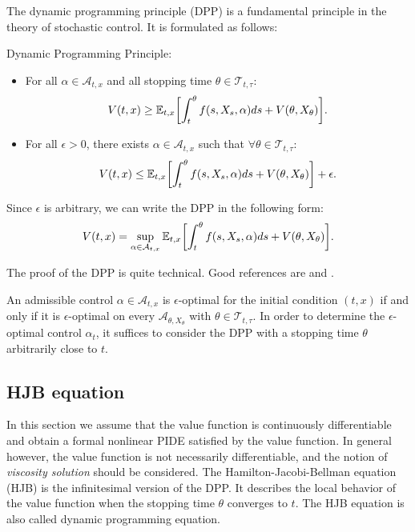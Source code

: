 \noindent
The dynamic programming principle (DPP) is a fundamental principle in the theory of stochastic control. It is formulated as follows:
\begin{Theorem} Dynamic Programming Principle:
 \begin{itemize}
  \item For all $\alpha \in \mathcal{A}_{t,x}$ and all stopping time $\theta \in \mathcal{T}_{t,\tau}$:
  \begin{equation}\label{DPP1}
   V(t,x) \geq \mathbb{E}_{t,x} \biggl[ \int_t^{\theta} f(s,X_s,\alpha) ds + V(\theta, X_{\theta}) \biggr]. 
  \end{equation}
  \item For all $\epsilon > 0$, there exists $\alpha \in \mathcal{A}_{t,x}$ such that $\forall \theta \in \mathcal{T}_{t,\tau}$: 
  \begin{equation}\label{DPP2}
      V(t,x) \leq \mathbb{E}_{t,x} \biggl[ \int_t^{\theta} f(s,X_s,\alpha) ds + V(\theta, X_{\theta}) \biggr] + \epsilon. 
  \end{equation}
 \end{itemize}
 Since $\epsilon$ is arbitrary, we can write the DPP in the following form:
  \begin{equation}\label{DPP3}
   V(t,x) = \sup_{\alpha \in \mathcal{A}_{t,x}} \mathbb{E}_{t,x} \biggl[ \int_t^{\theta} f(s,X_s,\alpha) ds + V(\theta, X_{\theta}) \biggr]. 
  \end{equation}
\end{Theorem}
The proof of the DPP is quite technical. Good references are \cite{Pham} and \cite{FlemingSoner}.


\noindent
An admissible control $\alpha \in \mathcal{A}_{t,x}$ is $\epsilon$-optimal for the initial condition $(t,x)$ if and only if it is $\epsilon$-optimal 
on every $\mathcal{A}_{\theta, X_{\theta}}$ with 
$\theta \in \mathcal{T}_{t,\tau}$. In order to determine the $\epsilon$-optimal control $\alpha_t$, it suffices to consider the DPP with a stopping time $\theta$
arbitrarily close to $t$.

\subsection{HJB equation}

In this section we assume that the value function is continuously differentiable and obtain a formal nonlinear PIDE satisfied by the value function.
In general however, the value function is not necessarily differentiable, and the notion of \emph{viscosity solution} should be considered.
The Hamilton-Jacobi-Bellman equation (HJB) is the infinitesimal version of the DPP. It describes the local behavior of the value function when the stopping time $\theta$ converges to $t$. 
The HJB equation is also called dynamic programming equation.
\newline

